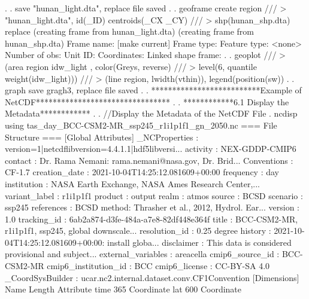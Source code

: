 {\smallskip}
. 
. save "hunan_light.dta", replace
file{} saved
{\smallskip}
. 
. geoframe create region ///
>    "hunan_light.dta", id(_ID) centroids(_CX _CY) ///
>     shp(hunan_shp.dta) replace
(creating frame {} from hunan_light.dta)
(creating frame {} from hunan_shp.dta)
{\smallskip}
            Frame name: {} [make current]
            Frame type: {}
          Feature type: <none>
         Number of obs: {}
               Unit ID: {}
           Coordinates: {}
    Linked shape frame: {}
{\smallskip}
. 
. geoplot ///
>   (area region idw_light , color(Greys, reverse) ///
>           level(6, quantile weight(idw_light))) ///
>   (line region, lwidth(vthin)), legend(position(sw))
{\smallskip}
. 
. graph save gragh3, replace
file {} saved
{\smallskip}
. 
. **************************Example of NetCDF********************************
. 
. ************6.1 Display the Metadata************
. 
. //Display the Metadata of the NetCDF File
. ncdisp using tas_day_BCC-CSM2-MR_ssp245_r1i1p1f1_gn_2050.nc
{\smallskip}
=== File Structure ===
{\smallskip}
[Global Attributes]
_NCProperties            : version=1|netcdflibversion=4.4.1.1|hdf5libversi...
activity                 : NEX-GDDP-CMIP6
contact                  : Dr. Rama Nemani: rama.nemani@nasa.gov, Dr. Brid...
Conventions              : CF-1.7
creation_date            : 2021-10-04T14:25:12.081609+00:00
frequency                : day
institution              : NASA Earth Exchange, NASA Ames Research Center,...
variant_label            : r1i1p1f1
product                  : output
realm                    : atmos
source                   : BCSD
scenario                 : ssp245
references               : BCSD method: Thrasher et al., 2012, Hydrol. Ear...
version                  : 1.0
tracking_id              : 6ab2a874-d3fe-484a-a7e8-82df448e364f
title                    : BCC-CSM2-MR, r1i1p1f1, ssp245, global downscale...
resolution_id            : 0.25 degree
history                  : 2021-10-04T14:25:12.081609+00:00: install globa...
disclaimer               : This data is considered provisional and subject...
external_variables       : areacella
cmip6_source_id          : BCC-CSM2-MR
cmip6_institution_id     : BCC
cmip6_license            : CC-BY-SA 4.0
_CoordSysBuilder         : ucar.nc2.internal.dataset.conv.CF1Convention
{\smallskip}
[Dimensions]
Name                 Length   Attribute      
time                 365      Coordinate     
lat                  600      Coordinate     
